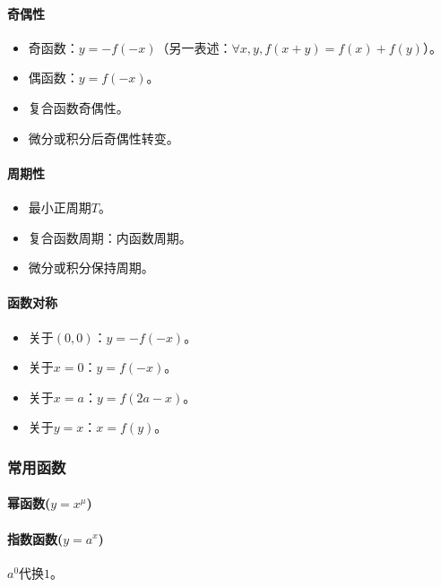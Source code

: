 \documentclass[
12pt, %
a4paper, 
oneside, %
headinclude,footinclude, %
]{scrartcl}
\begin{document}
\paragraph{奇偶性}
\begin{itemize}
\item 奇函数：$ y = -f(-x) $（另一表述：$ \forall x,y, f(x + y) = f(x) + f(y) $）。
\item 偶函数：$ y = f(-x) $。
\item 复合函数奇偶性。
\item 微分或积分后奇偶性转变。
\end{itemize}
\paragraph{周期性}
\begin{itemize}
\item 最小正周期$ T $。
\item 复合函数周期：内函数周期。
\item 微分或积分保持周期。
\end{itemize}
\paragraph{函数对称}
\begin{itemize}
\item 关于$ (0, 0) $：$ y = -f(-x) $。
\item 关于$ x = 0 $：$ y = f(-x) $。
\item 关于$ x = a $：$ y = f(2a - x) $。
\item 关于$ y = x $：$ x = f(y) $。
\end{itemize}
\subsubsection{常用函数}
\paragraph{幂函数($ y = x^\mu $)}
\paragraph{指数函数($ y =a ^x $)}
$ a^0 $代换$ 1 $。
\end{document}
